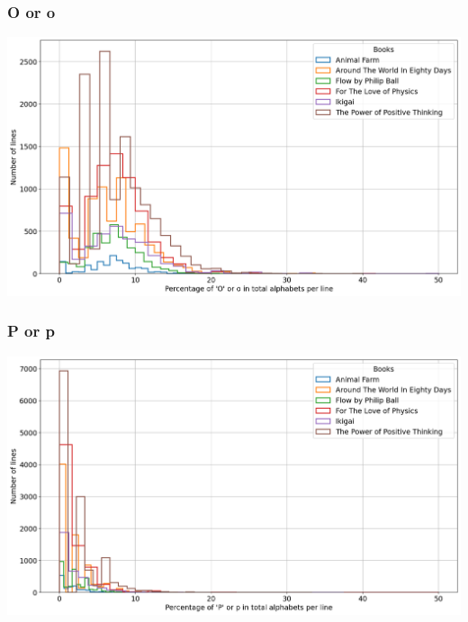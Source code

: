 \begin{frame}
    \frametitle{O or o}
    \begin{center}
        \hspace*{-5ex}
        \includegraphics[scale=0.35]{../01_programFiles/histograms/o.png}\hspace{10ex}
    \end{center}
\end{frame}

\begin{frame}
    \frametitle{P or p}
    \begin{center}
        \hspace*{-5ex}
        \includegraphics[scale=0.35]{../01_programFiles/histograms/p.png}\hspace{10ex}
    \end{center}
\end{frame}

